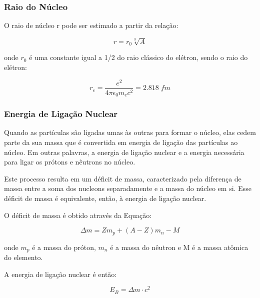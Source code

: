 \documentclass[11pt,a4paper]{article}
\begin{document}
            \subsubsection{Raio do Núcleo}

                O raio de núcleo r pode ser estimado a partir da relação:

                \begin{equation}
                    r = r_0 \sqrt[3]{A} 
                \end{equation}

                onde $r_0$ é uma constante igual a 1/2 do raio clássico do elétron, sendo o raio do elétron:

                \begin{equation}
                    r_e = \frac{e^2}{4 \pi \epsilon_0 m_e c^2} = 2.818 \; fm
                \end{equation}
            
            \subsubsection{Energia de Ligação Nuclear}

                Quando as partículas são ligadas umas às outras para formar o núcleo, elas cedem parte da sua massa que é convertida em energia de ligação das partículas ao núcleo. Em outras palavras, a energia de ligação nuclear e a energia necessária para ligar os prótons e nêutrons no núcleo. 

                Este processo resulta em um déficit de massa, caracterizado pela diferença de massa entre a soma dos nucleons separadamente e a massa do núcleo em si. Esse déficit de massa é equivalente, então, à energia de ligação nuclear.

                O déficit de massa é obtido através da Equação:

                    \begin{equation}
                        \Delta  m = Zm_p + (A - Z)m_n - M
                    \end{equation}

                onde $m_p$ é a massa do próton, $m_n$ é a massa do nêutron e M é a massa atômica do elemento.

                A energia de ligação nuclear é então:

                    \begin{equation}
                        E_B = \Delta m \cdot c^2
                    \end{equation}
\end{document}
